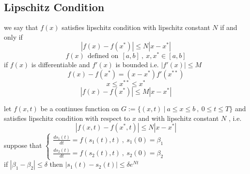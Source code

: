 \documentclass[]{article}
\begin{document}
\subsection{Lipschitz Condition}
we say that $f(x)$ satisfies lipschitz condition with lipschitz constant $N$ if and only if
\[
\left\lvert f(x) - f(x^*)\right\rvert \leq N \left\lvert x - x^*\right\rvert
\]
\[
f(x) \ \ \text{defined on} \ \ [a,b] \ , \ x,x^* \in [a,b]
\]
if $f(x)$ is differentiable and $f'(x)$ is bounded i.e. $|f'(x)| \leq M$
\[
    f(x) - f(x^*) = (x-x^*)f'(x^{**})
\]
\[
x \leq x^{**} \leq x^* 
\]
\[
    \left\lvert f(x) - f(x^*)\right\rvert \leq M \left\lvert x - x^*\right\rvert
\]
\begin{theorem}[]
    let $f(x,t)$ be a continues function on $G:=\{(x,t) \ | \ a\leq x\leq b \ , \ 0\leq t \leq T\}$ and
    \\
    satisfies lipschitz condition with respect to $x$ and with lipschitz constant $N$ , i.e.
    \[
        \left\lvert f(x,t) - f(x^*,t)\right\rvert \leq N \left\lvert x - x^*\right\rvert    
    \]
    suppose that 
    $
    \begin{cases}
        \displaystyle \frac{ds_1(t)}{dt} = f(s_1(t),t) \ , \  s_1(0) = \beta_1 
        \\
        \displaystyle \frac{ds_2(t)}{dt} = f(s_2(t),t) \ , \  s_2(0) = \beta_2
    \end{cases}
    $
    \\
    if $\left\lvert \beta_1 - \beta_2 \right\rvert \leq \delta $ then $\left\lvert s_1(t) - s_2(t) \right\rvert \leq \delta e^{Nt} $ 
\end{theorem}
\end{document}
